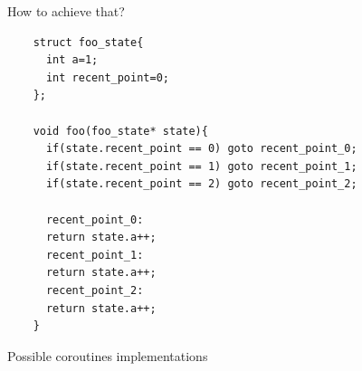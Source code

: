\documentclass[10pt]{beamer}
\begin{document}
\begin{frame}[fragile]{How to achieve that?}
\begin{verbatim}
    struct foo_state{
      int a=1;
      int recent_point=0;
    };

    void foo(foo_state* state){
      if(state.recent_point == 0) goto recent_point_0;
      if(state.recent_point == 1) goto recent_point_1;
      if(state.recent_point == 2) goto recent_point_2;
  
      recent_point_0:
      return state.a++;
      recent_point_1:
      return state.a++;
      recent_point_2:
      return state.a++;
    }
\end{verbatim}
\end{frame}

\begin{frame}{Possible coroutines implementations}
\begin{columns}[t]


\end{columns}
\end{frame}
\end{document}
